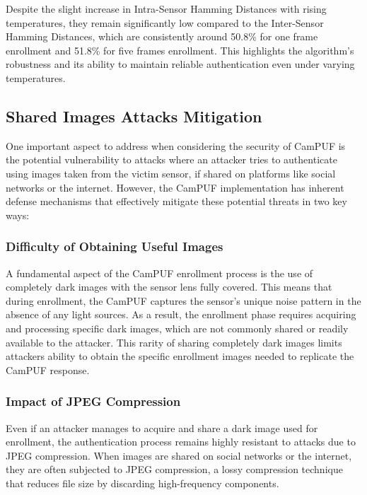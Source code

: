Despite the slight increase in Intra-Sensor Hamming Distances with rising temperatures, they remain significantly low compared to the Inter-Sensor Hamming Distances, which are consistently around 50.8\% for one frame enrollment and 51.8\% for five frames enrollment. This highlights the algorithm's robustness and its ability to maintain reliable authentication even under varying temperatures.

\subsection{Shared Images Attacks Mitigation}\label{sec:attacks}

One important aspect to address when considering the security of CamPUF is the potential vulnerability to attacks where an attacker tries to authenticate using images taken from the victim sensor, if shared on platforms like social networks or the internet. However, the CamPUF implementation has inherent defense mechanisms that effectively mitigate these potential threats in two key ways:

\subsubsection{Difficulty of Obtaining Useful Images}

A fundamental aspect of the CamPUF enrollment process is the use of completely dark images with the sensor lens fully covered. This means that during enrollment, the CamPUF captures the sensor's unique noise pattern in the absence of any light sources. As a result, the enrollment phase requires acquiring and processing specific dark images, which are not commonly shared or readily available to the attacker. This rarity of sharing completely dark images limits attackers ability to obtain the specific enrollment images needed to replicate the CamPUF response.

\subsubsection{Impact of JPEG Compression}

Even if an attacker manages to acquire and share a dark image used for enrollment, the authentication process remains highly resistant to attacks due to JPEG compression. When images are shared on social networks or the internet, they are often subjected to JPEG compression, a lossy compression technique that reduces file size by discarding high-frequency components. \cite{jpeg}

